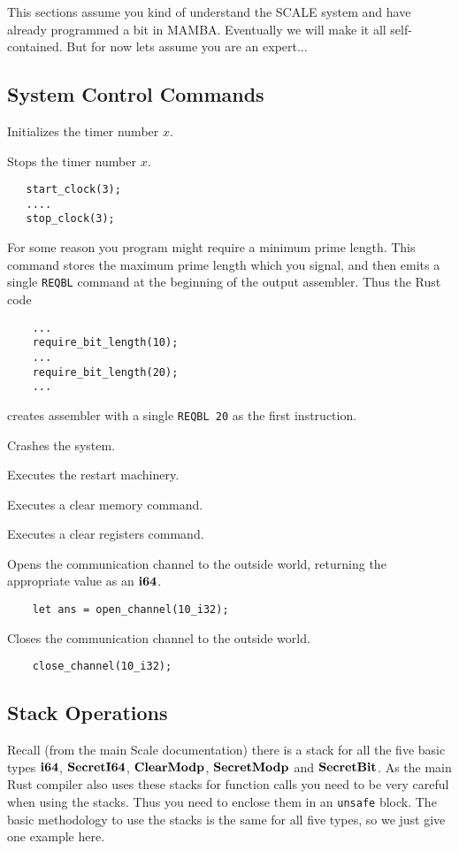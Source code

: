 This sections assume you kind of understand the SCALE system
and have already programmed a bit in MAMBA. Eventually we will
make it all self-contained. But for now lets assume you are
an expert...

\subsection{System Control Commands}
Initializes the timer number $x$.

Stops the timer number $x$.
\begin{lstlisting}
   start_clock(3);
   ....
   stop_clock(3);
\end{lstlisting}

For some reason you program might require a minimum prime
length. This command stores the maximum prime length which you
signal, and then emits a single \verb|REQBL| command at the
beginning of the output assembler.
Thus the Rust code
\begin{lstlisting}
    ...
    require_bit_length(10);
    ...
    require_bit_length(20);
    ...
\end{lstlisting}
creates assembler with a single \verb|REQBL 20| as the first 
instruction.

Crashes the system.

Executes the restart machinery.

Executes a clear memory command.

Executes a clear registers command.

Opens the communication channel to the outside world, returning
the appropriate value as an $\mathbf{i64}$.
\begin{lstlisting}
    let ans = open_channel(10_i32);
\end{lstlisting}

Closes the communication channel to the outside world.
\begin{lstlisting}
    close_channel(10_i32);
\end{lstlisting}


\subsection{Stack Operations}
Recall (from the main Scale documentation) there is a stack for all 
the five basic types $\mathbf{i64}$, $\mathbf{SecretI64}$, $\mathbf{ClearModp}$, $\mathbf{SecretModp}$ and $\mathbf{SecretBit}$.
As the main Rust compiler also uses these stacks for function
calls you need to be very careful when using the stacks.
Thus you need to enclose them in an \verb|unsafe| block.
The basic methodology to use the stacks is the same for all five
types, so we just give one example here.

